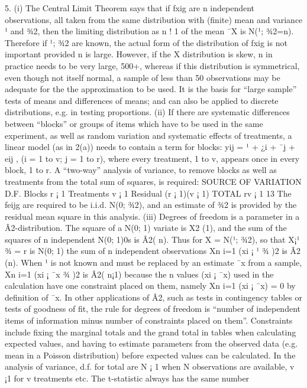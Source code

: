 5. (i) The Central Limit Theorem says that if fxig are n independent observations,
all taken from the same distribution with (finite) mean and variance ¹ and
¾2, then the limiting distribution as n ! 1 of the mean ¯X is N(¹; ¾2=n).
Therefore if ¹; ¾2 are known, the actual form of the distribution of fxig is
not important provided n is large. However, if the X distribution is skew,
n in practice needs to be very large, 500+, whereas if this distribution is
symmetrical, even though not itself normal, a sample of less than 50 observations
may be adequate for the the approximation to be used. It is the basis
for “large sample” tests of means and differences of means; and can also be
applied to discrete distributions, e.g. in testing proportions.
(ii) If there are systematic differences between “blocks” or groups of items which
have to be used in the same experiment, as well as random variation and
systematic effects of treatments, a linear model (as in 2(a)) needs to contain
a term for blocks: yij = ¹ + ¿i + ¯j + eij , (i = 1 to v; j = 1 to r), where
every treatment, 1 to v, appears once in every block, 1 to r. A “two-way”
analysis of variance, to remove blocks as well as treatments from the total
sum of squares, is required:
SOURCE OF VARIATION D.F.
Blocks r ¡ 1
Treatments v ¡ 1
Residual (r ¡ 1)(v ¡ 1)
TOTAL rv ¡ 1
13
The feijg are required to be i.i.d. N(0; ¾2), and an estimate of ¾2 is provided
by the residual mean square in this analysis.
(iii) Degrees of freedom is a parameter in a Â2-distribution. The square of a
N(0; 1) variate is X2
(1), and the sum of the squares of n independent N(0; 1)0s
is Â2(
n). Thus for X = N(¹; ¾2), so that X¡¹
¾ = r is N(0; 1) the sum of n
independent observations
Xn
i=1
(xi ¡ ¹
¾
)2 is Â2
(n). When ¹ is not known and
must be replaced by an estimate ¯x from a sample,
Xn
i=1
(xi ¡ ¯x
¾
)2 is Â2(
n¡1)
because the n values (xi ¡ ¯x) used in the calculation have one constraint
placed on them, namely
Xn
i=1
(xi ¡ ¯x) = 0 by definition of ¯x. In other applications
of Â2, such as tests in contingency tables or tests of goodness of fit, the
rule for degrees of freedom is “number of independent items of information
minus number of constraints placed on them”. Constraints include fixing the
marginal totals and the grand total in tables when calculating expected values,
and having to estimate parameters from the observed data (e.g. mean
in a Poisson distribution) before expected values can be calculated. In the
analysis of variance, d.f. for total are N ¡ 1 when N observations are available,
v ¡1 for v treatments etc. The t-statistic always has the same number
